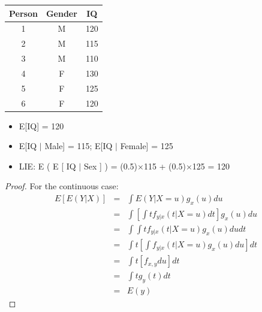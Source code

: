 \documentclass[notes=show]{beamer}
\begin{document}
\begin{frame}[plain]

\begin{center}
		\begin{tabular}{ccc}
		\hline
		\textbf{Person} & \textbf{Gender} & \textbf{IQ} \\
		\hline
1 &	M &	120 \\
2 &	M &	115 \\
3 &	M &	110 \\
\hline
4 &	F &	130 \\
5 &	F &	125 \\
6 &	F &	120 \\
		\hline 
		\end{tabular}
\end{center}		

\begin{itemize}
\item E[IQ] = 120
\item E[IQ $|$ Male] = 115; E[IQ $|$ Female] = 125
\item LIE: E ( E [ IQ $|$ Sex ] )  = (0.5)$\times$115 + (0.5)$\times$125 = 120
\end{itemize}

\end{frame}


\begin{frame}[plain]
	\begin{proof}
	For the continuous case:
	\begin{eqnarray*}
		E [ E(Y|X) ] &=& \int E (Y|X=u) g_x(u) du \\
				  &=& \int \left[ \int t f_{y|x} (t|X=u) dt \right] g_x(u)du \\
				  &=& \int \int tf_{y|x}(t|X=u) g_x(u) dudt \\
				  &=& \int t \left[ \int f_{y|x} (t|X=u) g_x(u) du \right] dt \\
				  &=& \int t \left[ f_{x,y} du \right]dt \\
				  &=& \int t g_y(t) dt \\
				  &=& E(y)
	\end{eqnarray*}
	\end{proof}
\end{frame}



\end{document}
